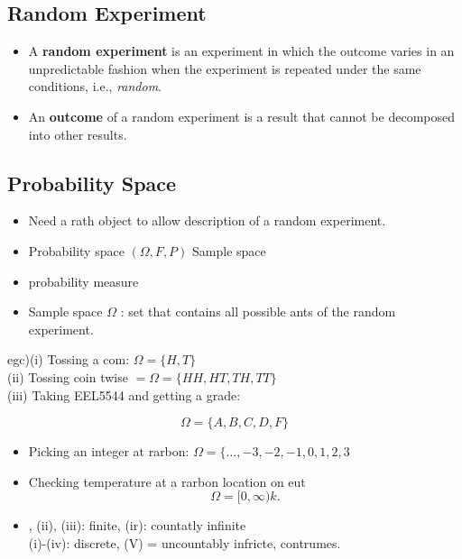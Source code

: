 \subsection{Random Experiment}
\begin{itemize}
\item A \textbf{random experiment} is an experiment in which the
outcome varies in an unpredictable fashion when the experiment is
repeated under the same conditions, i.e., \emph{random}.
\item An \textbf{outcome} of a random experiment is a result that
cannot be decomposed into other results.
\end{itemize}

\subsection{Probability Space}
\begin{itemize}
  \item[-] Need a rath object to allow description of a random experiment.
  \item[-] Probability space \((\Omega, F, P)\) Sample space
  \item[] probability measure
  \item[-] Sample space \(\Omega\) : set that contains all possible ants of the random experiment.
\end{itemize}

egc)(i) Tossing a com: \(\Omega=\{H, T\}\)\\
(ii) Tossing coin twise \(=\Omega=\{H H, H T, T H, T T\}\)\\
(iii) Taking EEL5544 and getting a grade:

\[
\Omega=\{A, B, C, D, F\}
\]

\begin{itemize}
  \item[(iv)] Picking an integer at rarbon: \(\Omega=\{\ldots,-3,-2,-1,0,1,2,3\)
  \item[(v)] Checking temperature at a rarbon location on eut
\[
\Omega=[0, \infty) k .
\]
  \item[(i)] , (ii), (iii): finite, (ir): countatly infinite\\
(i)-(iv): discrete, (V) = uncountably infricte, contrumes.
\end{itemize}
